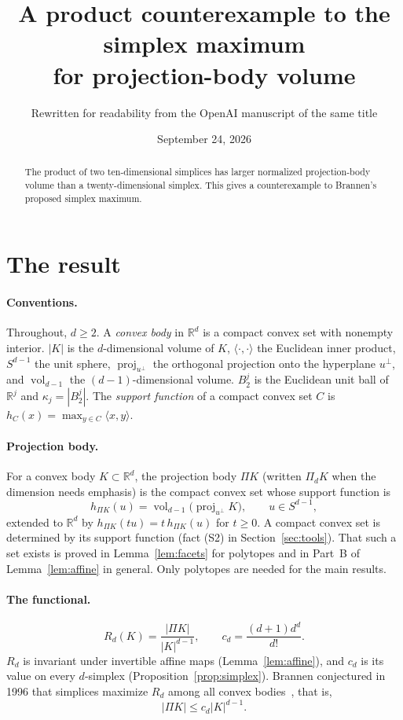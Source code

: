 \documentclass[11pt]{article}
\title{A product counterexample to the simplex maximum\\
for projection-body volume}
\author{Rewritten for readability from the OpenAI manuscript of the same title}
\date{September 24, 2026}
\newcommand{\R}{\mathbb R}
\DeclareMathOperator{\vol}{vol}
\DeclareMathOperator{\proj}{proj}
\begin{document}
\maketitle

\begin{abstract}
The product of two ten-dimensional simplices has larger normalized
projection-body volume than a twenty-dimensional simplex. This gives
a counterexample to Brannen's proposed simplex maximum.
\end{abstract}

\section{The result}\label{sec:result}

\paragraph{Conventions.}
Throughout, \(d\ge2\). A \emph{convex body} in \(\R^d\) is a compact
convex set with nonempty interior. \(|K|\) is the \(d\)-dimensional volume
of \(K\), \(\langle\cdot,\cdot\rangle\) the Euclidean inner product,
\(S^{d-1}\) the unit sphere, \(\proj_{u^\perp}\) the orthogonal projection
onto the hyperplane \(u^\perp\), and \(\vol_{d-1}\) the
\((d-1)\)-dimensional volume. \(B_2^j\) is the Euclidean unit ball of
\(\R^j\) and \(\kappa_j=|B_2^j|\). The \emph{support function} of a compact
convex set \(C\) is \(h_C(x)=\max_{y\in C}\langle x,y\rangle\).

\paragraph{Projection body.}
For a convex body \(K\subset\R^d\), the projection body \(\Pi K\) (written
\(\Pi_dK\) when the dimension needs emphasis) is the compact convex set whose
support function is
\[
 h_{\Pi K}(u)=\vol_{d-1}\bigl(\proj_{u^\perp}K\bigr),
 \qquad u\in S^{d-1},
\]
extended to \(\R^d\) by \(h_{\Pi K}(tu)=t\,h_{\Pi K}(u)\) for \(t\ge0\).
A compact convex set is determined by its support function (fact (S2) in
Section~\ref{sec:tools}). That such a set exists is proved in
Lemma~\ref{lem:facets} for polytopes and in Part~B of
Lemma~\ref{lem:affine} in general. Only polytopes are needed for the main
results.

\paragraph{The functional.}
\begin{equation}\label{eq:functional}
 R_d(K)=\frac{|\Pi K|}{|K|^{d-1}},
 \qquad c_d=\frac{(d+1)d^d}{d!}.
\end{equation}
\(R_d\) is invariant under invertible affine maps (Lemma~\ref{lem:affine}),
and \(c_d\) is its value on every \(d\)-simplex
(Proposition~\ref{prop:simplex}). Brannen conjectured in 1996 that
simplices maximize \(R_d\) among all convex bodies~\cite{Brannen}, that is,
\begin{equation}\label{eq:proposed-bound}
 |\Pi K|\le c_d|K|^{d-1}.
\end{equation}
\end{document}

